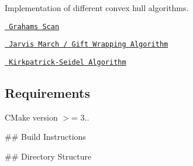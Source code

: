 Implementation of different convex hull algorithms.
\begin{DoxyItemize}
\item \href{http://www.math.ucsd.edu/~ronspubs/72_10_convex_hull.pdf}{\texttt{ Graham\textquotesingle{}s Scan}}
\item \href{https://en.wikipedia.org/wiki/Gift_wrapping_algorithm}{\texttt{ Jarvis March / Gift Wrapping Algorithm}}
\item \href{http://hdl.handle.net/1813/6417}{\texttt{ Kirkpatrick-\/\+Seidel Algorithm}}
\end{DoxyItemize}

\subsection*{Requirements}

{\ttfamily C\+Make} version $>$= 3..

\#\# Build Instructions 
\begin{DoxyCode}{0}
\end{DoxyCode}


\#\# Directory Structure 
\begin{DoxyCode}{0}
\end{DoxyCode}
 